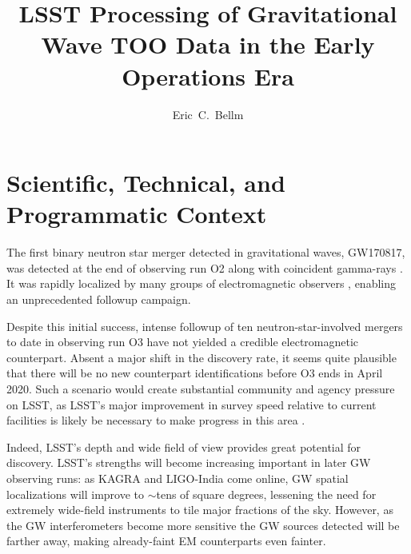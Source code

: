 \documentclass[DM,authoryear,toc]{lsstdoc}
\title{LSST Processing of Gravitational Wave TOO Data in the Early Operations Era}
\author{%
Eric~C.~Bellm
}
\date{\vcsDate}
\begin{document}


\maketitle

\section{Scientific, Technical, and Programmatic Context}

The first binary neutron star merger detected in gravitational waves, GW170817, was detected at the end of observing run O2 \citep{2017PhRvL.119p1101A} along with coincident gamma-rays \citep{2017ApJ...848L..13A}.  
It was rapidly localized by many groups of electromagnetic observers \citep{2017ApJ...848L..12A}, enabling an unprecedented followup campaign.

Despite this initial success, intense followup of ten neutron-star-involved mergers to date in observing run O3 have not yielded a credible electromagnetic counterpart.
Absent a major shift in the discovery rate, it seems quite plausible that there will be no new counterpart identifications before O3 ends in April 2020.
Such a scenario would create substantial community and agency pressure on LSST, as LSST's major improvement in survey speed relative to current facilities is likely be necessary to make progress in this area \citep[e.g.,][]{2019arXiv191011246C}.

Indeed, LSST's depth and wide field of view provides great potential for discovery. 
LSST's strengths will become increasing important in later GW observing runs: 
as KAGRA and LIGO-India come online, GW spatial localizations will improve to $\sim$tens of square degrees, lessening the need for extremely wide-field instruments to tile major fractions of the sky.  
However, as the GW interferometers become more sensitive the GW sources detected will be farther away, making already-faint EM counterparts even fainter.
\end{document}
